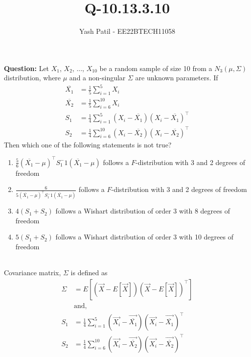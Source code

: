 \documentclass[journal,12pt,twocolumn]{IEEEtran}
\theoremstyle{remark}
\begin{document}



\vspace{3cm}

\title{
Q-10.13.3.10
}
\author{Yash Patil - EE22BTECH11058}

\maketitle
\textbf{Question:} Let $X_1$, $X_2$, ..., $X_{10}$ be a random sample of size 10 from a $N_3(\mu,\Sigma)$ distribution, where $\mu$ and a non-singular $\Sigma$ are unknown parameters. If
\begin{align}
	\overline{X_1} &= \frac{1}{5}\sum_{i=1}^5X_i\\
	\overline{X_2} &= \frac{1}{5}\sum_{i=6}^{10}X_i\\
	S_1 &= \frac{1}{4}\sum_{i=1}^5(X_i-\overline{X_1})(X_i-\overline{X_1})^\top\\
	S_2 &= \frac{1}{4}\sum_{i=6}^{10}(X_i-\overline{X_2})(X_i-\overline{X_2})^\top
\end{align}
Then which one of the following statements is not true?
\begin{enumerate}
	\item $\frac{5}{6}(\overline{X_1}-\mu)^{\top}S_1^-1(\overline{X_1}-\mu)$ follows a $F$-distribution with 3 and 2 degrees of freedom
	\item $\frac{6}{5(\overline{X_1}-\mu)^{\top}S_1^-1(\overline{X_1}-\mu)}$ follows a $F$-distribution with 3 and 2 degrees of freedom
	\item $4(S_1 + S_2)$ follows a Wishart distribution of order 3 with 8 degrees of freedom
	\item $5(S_1 + S_2)$ follows a Wishart distribution of order 3 with 10 degrees of freedom
\end{enumerate}
\solution\\
Covariance matrix, $\Sigma$ is defined as
\begin{align}
	\Sigma &= E[(\vec{X}-E[\vec{X}])(\vec{X}-E[\vec{X}])^\top]\\
	&\text{and,}\\
	S_1 &= \frac{1}{4}\sum_{i=1}^5(\vec{X_i}-\vec{\overline{X_1}})(\vec{X_i}-\vec{\overline{X_1}})^\top\\
	S_2 &= \frac{1}{4}\sum_{i=6}^{10}(\vec{X_i}-\vec{\overline{X_2}})(\vec{X_i}-\vec{\overline{X_2}})^\top
\end{align}
\end{document}
